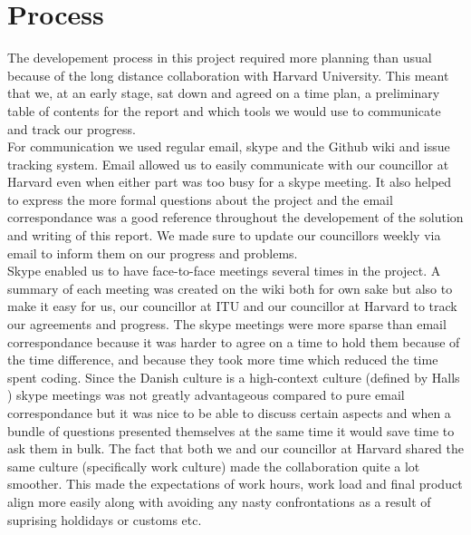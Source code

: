 
\section{Process}
\label{process}


The developement process in this project required more planning than usual because of the long distance collaboration with Harvard University. This meant that we, at an early stage, sat down and agreed on a time plan, a preliminary table of contents for the report and which tools we would use to communicate and track our progress. \\

For communication we used regular email, skype and the Github \cite{github} wiki and issue tracking system. Email allowed us to easily communicate with our councillor at Harvard even when either part was too busy for a skype meeting. It also helped to express the more formal questions about the project and the email correspondance was a good reference throughout the developement of the solution and writing of this report. We made sure to update our councillors weekly via email to inform them on our progress and problems.\\

Skype enabled us to have face-to-face meetings several times in the project. A summary of each meeting was created on the wiki both for own sake but also to make it easy for us, our councillor at ITU and our councillor at Harvard to track our agreements and progress. The skype meetings were more sparse than email correspondance because it was harder to agree on a time to hold them because of the time difference, and because they took more time which reduced the time spent coding. Since the Danish culture is a high-context culture (defined by Halls \cite{halls}) skype meetings was not greatly advantageous compared to pure email correspondance but it was nice to be able to discuss certain aspects and when a bundle of questions presented themselves at the same time it would save time to ask them in bulk. The fact that both we and our councillor at Harvard shared the same culture (specifically work culture) made the collaboration quite a lot smoother. This made the expectations of work hours, work load and final product align more easily along with avoiding any nasty confrontations as a result of suprising holdidays or customs etc. \\

